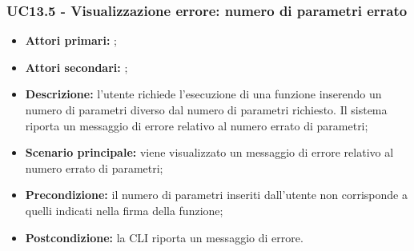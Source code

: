 \subsubsection{UC13.5 - Visualizzazione errore: numero di parametri errato}
\begin{itemize}
	\item \textbf{Attori primari:} \ua{};
	\item \textbf{Attori secondari:} \re{};
	\item \textbf{Descrizione:} l’utente richiede l’esecuzione di una funzione inserendo un numero di parametri diverso dal numero di parametri richiesto. Il sistema riporta un messaggio di errore relativo al numero errato di parametri;
	\item \textbf{Scenario principale:} viene visualizzato un messaggio di errore relativo al numero errato di parametri;
	\item \textbf{Precondizione:} il numero di parametri inseriti dall’utente non corrisponde a quelli indicati nella firma della funzione;
	\item \textbf{Postcondizione:} la CLI riporta un messaggio di errore.
\end{itemize}